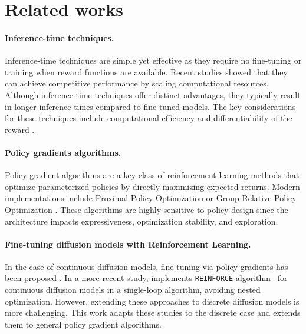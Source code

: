 \section{Related works}
\paragraph{Inference-time techniques.}
Inference-time techniques are simple yet effective as they require no fine-tuning or training when reward functions are available. Recent studies \cite{singhal2025general,ma2025inference} showed that they can achieve competitive performance by scaling computational resources. Although inference-time techniques offer distinct advantages, they typically result in longer inference times compared to fine-tuned models. The key considerations for these techniques include computational efficiency and differentiability of the reward \cite{uehara2025reward}.

\paragraph{Policy gradients algorithms.}
Policy gradient algorithms are a key class of reinforcement learning methods that optimize parameterized policies by directly maximizing expected returns. Modern implementations include Proximal Policy Optimization \cite{schulman2017proximal} or Group Relative Policy Optimization \cite{shao2024deepseekmath}. These algorithms are highly sensitive to policy design since the architecture impacts expressiveness, optimization stability, and exploration.

\paragraph{Fine-tuning diffusion models with Reinforcement Learning.}
In the case of continuous diffusion models, fine-tuning via policy gradients has been proposed \cite{fan2024reinforcement,li2024learning,black2023training,ren2024diffusion}. In a more recent study, \cite{marion2024implicit} implements \texttt{REINFORCE} algorithm~\cite{williams1992simple} for continuous diffusion models in a single-loop algorithm, avoiding nested optimization. However, extending these approaches to discrete diffusion models is more challenging. This work adapts these studies to the discrete case and extends them to general policy gradient algorithms.